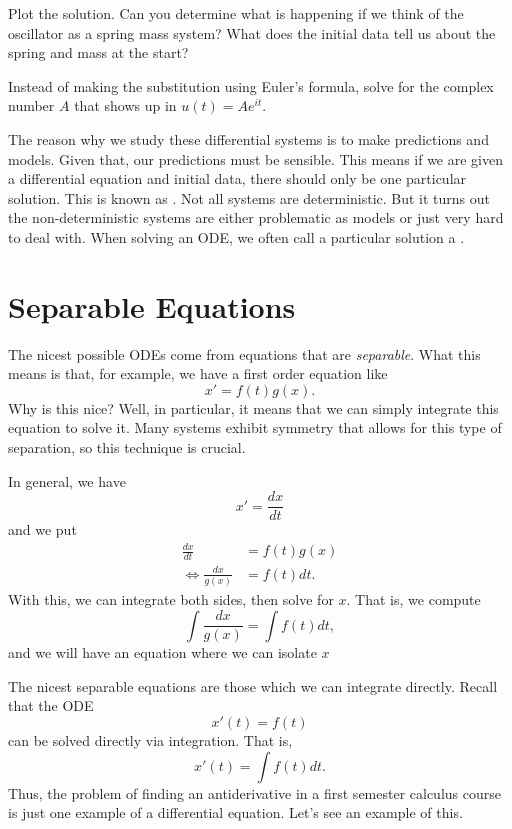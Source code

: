         \begin{exercise}
        Plot the solution. Can you determine what is happening if we think of the oscillator as a spring mass system? What does the initial data tell us about the spring and mass at the start?
        \end{exercise}
        
        \begin{exercise}
            Instead of making the substitution using Euler's formula, solve for the complex number $A$ that shows up in $u(t)=Ae^{it}$.
        \end{exercise}
        
        The reason why we study these differential systems is to make predictions and models.  Given that, our predictions must be sensible. This means if we are given a differential equation and initial data, there should only be one particular solution.  This is known as .     Not all systems are deterministic.  But it turns out the non-deterministic systems are either problematic as models or just very hard to deal with. When solving an ODE, we often call a particular solution a .
        
        \section{Separable Equations}
        The nicest possible ODEs come from equations that are \emph{separable}.  What this means is that, for example, we have a first order equation like
        \[
        x'=f(t)g(x).
        \]
        Why is this nice? Well, in particular, it means that we can simply integrate this equation to solve it.  Many systems exhibit symmetry that allows for this type of separation, so this technique is crucial.
        
        In general, we have
        \[
        x'=\frac{dx}{dt}
        \]
        and we put
        \begin{align*}
            \frac{dx}{dt}&=f(t)g(x)\\
            \iff \frac{dx}{g(x)} &= f(t)dt.
        \end{align*}
        With this, we can integrate both sides, then solve for $x$. That is, we compute
        \[
        \int \frac{dx}{g(x)} = \int f(t)dt,
        \]
        and we will have an equation where we can isolate $x$

        The nicest separable equations are those which we can integrate directly.  Recall that the ODE
        \[ 
            x'(t) =f(t)
        \]
        can be solved directly via integration.  That is,
        \[
            x'(t) = \int f(t)dt.
        \]
        Thus, the problem of finding an antiderivative in a first semester calculus course is just one example of a differential equation.  Let's see an example of this.
        

